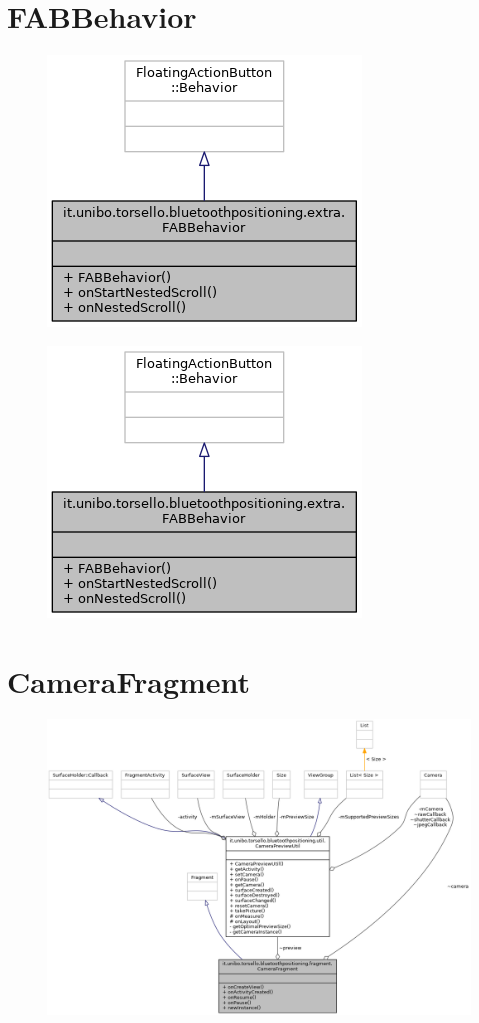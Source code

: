 \newpage
\section{FABBehavior}
\begin{figure}[ph]
	\centering
	\includegraphics[width=0.5\linewidth]{img/uml/class/classit_1_1unibo_1_1torsello_1_1bluetoothpositioning_1_1extra_1_1FABBehavior__coll__graph.png}
	\caption{}
\end{figure}

\begin{figure}[ph]
	\centering
	\includegraphics[width=0.5\linewidth]{img/uml/class/classit_1_1unibo_1_1torsello_1_1bluetoothpositioning_1_1extra_1_1FABBehavior__inherit__graph.png}
	\caption{}
\end{figure}

\newpage
\section{CameraFragment}
\begin{figure}[ph]
	\centering
	\includegraphics[width=1.2\linewidth]{img/uml/class/classit_1_1unibo_1_1torsello_1_1bluetoothpositioning_1_1fragment_1_1CameraFragment__coll__graph.png}
	\caption{}
\end{figure}

